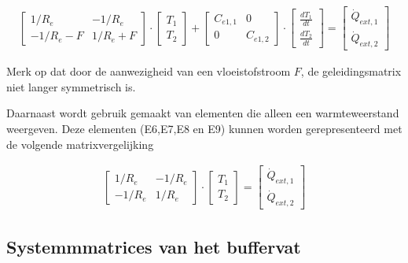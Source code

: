 \begin{equation}
	\begin{aligned}
	\begin{bmatrix}
	    1/R_e & -1/R_e \\
	    -1/R_e -F &  1/R_e + F
    \end{bmatrix}
    \cdot
    \begin{bmatrix}
    	T_1 \\
    	T_2
    \end{bmatrix}
    +
    	\begin{bmatrix}
    	C_{e1,1} & 0 \\
    	0 &  C_{e1,2}
    \end{bmatrix}
    \cdot
    \begin{bmatrix}
    	\frac{dT_1}{dt} \\
	    \frac{dT_2}{dt}
    \end{bmatrix}	
    =
        \begin{bmatrix}
    	\dot{Q}_{ext,1} \\
    	\dot{Q}_{ext,2}
    \end{bmatrix}  	
	\end{aligned}
\end{equation}

Merk op dat door de aanwezigheid van een vloeistofstroom $F$, de geleidingsmatrix niet langer symmetrisch is.

Daarnaast wordt gebruik gemaakt van elementen die alleen een warmteweerstand weergeven. Deze
elementen (E6,E7,E8 en E9) kunnen worden gerepresenteerd met de volgende matrixvergelijking

\begin{equation}
	\begin{aligned}
		\begin{bmatrix}
			1/R_e & -1/R_e \\
			-1/R_e &  1/R_e
		\end{bmatrix}
		\cdot
		\begin{bmatrix}
			T_1 \\
			T_2
		\end{bmatrix}	
		=
		\begin{bmatrix}
			\dot{Q}_{ext,1} \\
			\dot{Q}_{ext,2}
		\end{bmatrix}  	
	\end{aligned}
\end{equation}

\subsection{Systemmmatrices van het buffervat}

